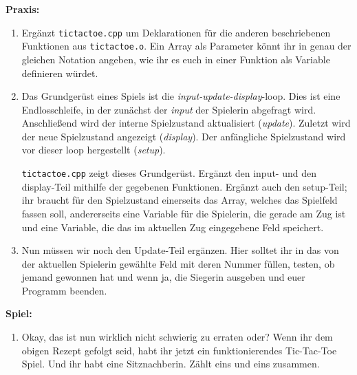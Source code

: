 \textbf{Praxis:}
\begin{enumerate}
    \item Ergänzt \texttt{tictactoe.cpp} um Deklarationen für die anderen
        beschriebenen Funktionen aus \texttt{tictactoe.o}. Ein Array als
        Parameter könnt ihr in genau der gleichen Notation angeben, wie ihr es
        euch in einer Funktion als Variable definieren würdet.
    \item Das Grundgerüst eines Spiels ist die \emph{input-update-display}-loop.
        Dies ist eine Endlosschleife, in der zunächst der \emph{input} der
        Spielerin abgefragt wird. Anschließend wird der interne Spielzustand
        aktualisiert (\emph{update}). Zuletzt wird der neue Spielzustand
        angezeigt (\emph{display}). Der anfängliche Spielzustand wird vor
        dieser loop hergestellt (\emph{setup}).

        \texttt{tictactoe.cpp} zeigt dieses Grundgerüst. Ergänzt den input- und
        den display-Teil mithilfe der gegebenen Funktionen. Ergänzt auch den
        setup-Teil; ihr braucht für den Spielzustand einerseits das Array,
        welches das Spielfeld fassen soll, andererseits eine Variable für die
        Spielerin, die gerade am Zug ist und eine Variable, die das im
        aktuellen Zug eingegebene Feld speichert.
    \item Nun müssen wir noch den Update-Teil ergänzen. Hier solltet ihr in das
        von der aktuellen Spielerin gewählte Feld mit deren Nummer füllen,
        testen, ob jemand gewonnen hat und wenn ja, die Siegerin ausgeben und
        euer Programm beenden.
\end{enumerate}

\textbf{Spiel:}
\begin{enumerate}
    \item Okay, das ist nun wirklich nicht schwierig zu erraten oder? Wenn ihr
        dem obigen Rezept gefolgt seid, habt ihr jetzt ein funktionierendes
        Tic-Tac-Toe Spiel. Und ihr habt eine Sitznachberin. Zählt eins und eins
        zusammen.
\end{enumerate}
